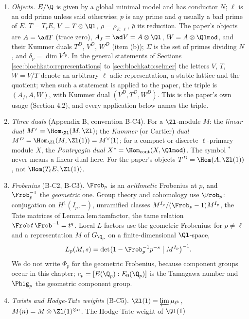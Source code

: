\begin{convention}\label{conv:blochkato:setup}
\begin{enumerate}[label=(\alph*)]
\item \emph{Objects.} $E/\Q$ is given by a global minimal model and has conductor $N$; $\ell$ is an odd prime unless said otherwise;
$p$ is any prime and $q$ usually a bad prime of $E$. $T=T_\ell E$, $V=T\otimes\Ql$, $\rho=\rho_{E,\ell}$, $\bar\rho$ its reduction. The paper's
objects are $A=\ad T$ (trace zero), $A_f=\ad V=A\otimes\Ql$, $W=A\otimes\Qlmod$, and their Kummer duals $T^D$, $V^D$, $W^D$ (item (b));
$\Sigma$ is the set of primes dividing $N$, and $\delta_p=\dim V^{I_p}$. In the general statements of Sections \ref{sec:blochkato:representations}
to \ref{sec:blochkato:selmer} the letters $V$, $T$, $W=V/T$ denote an arbitrary $\ell$-adic representation, a stable lattice and the
quotient; when such a statement is applied to the paper, the triple is $(A_f,A,W)$, with Kummer dual $(V^D,T^D,W^D)$. This is the
paper's own usage (Section 4.2), and every application below names the triple.
\item \emph{Three duals} (Appendix B, convention B-C4). For a $\Zl$-module $M$: the \emph{linear dual} $M^\vee=\Hom_{\Zl}(M,\Zl)$; the
\emph{Kummer} (or Cartier) \emph{dual} $M^D=\Hom_{\Zl}(M,\Zl(1))=M^\vee(1)$; for a compact or discrete $\ell$-primary module $X$, the
\emph{Pontryagin dual} $X^*=\Hom_{\mathrm{cont}}(X,\Qlmod)$. The symbol ${}^*$ never means a linear dual here. For the paper's objects
$T^D=\Hom(A,\Zl(1))$, not $\Hom(T_\ell E,\Zl(1))$.
\item \emph{Frobenius} (B-C2, B-C3). $\Frob_p$ is an \emph{arithmetic} Frobenius at $p$, and $\Frob_p^{-1}$ the \emph{geometric} one. Group
theory and cohomology use $\Frob_p$: conjugation on $H^1(I_p,-)$, unramified classes $M^{I_p}/(\Frob_p-1)M^{I_p}$, the Tate matrices of Lemma
lem:tamfactor, the tame relation $\Frob\,t\,\Frob^{-1}=t^q$. Local $L$-factors use the geometric Frobenius: for $p\ne\ell$ and a
representation $M$ of $G_{\Q_p}$ on a finite-dimensional $\Ql$-space,
\[
L_p(M,s)=\det\bigl(1-\Frob_p^{-1}p^{-s}\bigm|M^{I_p}\bigr)^{-1}.
\]
We do not write $\Phi_p$ for the geometric Frobenius, because component groups occur in this chapter; $c_p=[E(\Q_p):E_0(\Q_p)]$ is the
Tamagawa number and $\Phig_p$ the geometric component group.
\item \emph{Twists and Hodge-Tate weights} (B-C5). $\Zl(1)=\varprojlim\mu_{\ell^k}$, $M(n)=M\otimes\Zl(1)^{\otimes n}$. The Hodge-Tate weight of $\Ql(1)$

\end{enumerate}
\end{convention}
